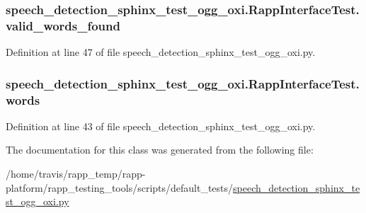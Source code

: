 \hypertarget{classspeech__detection__sphinx__test__ogg__oxi_1_1RappInterfaceTest_a74ac425a0ac46811a1f5e3796cc92e71}{
\subsubsection[{valid\-\_\-words\-\_\-found}]{\setlength{\rightskip}{0pt plus 5cm}speech\-\_\-detection\-\_\-sphinx\-\_\-test\-\_\-ogg\-\_\-oxi.\-Rapp\-Interface\-Test.\-valid\-\_\-words\-\_\-found}}\label{classspeech__detection__sphinx__test__ogg__oxi_1_1RappInterfaceTest_a74ac425a0ac46811a1f5e3796cc92e71}


Definition at line 47 of file speech\-\_\-detection\-\_\-sphinx\-\_\-test\-\_\-ogg\-\_\-oxi.\-py.

\hypertarget{classspeech__detection__sphinx__test__ogg__oxi_1_1RappInterfaceTest_ae6a274d1b4554695797d5ef5ae3fe2b0}{
\subsubsection[{words}]{\setlength{\rightskip}{0pt plus 5cm}speech\-\_\-detection\-\_\-sphinx\-\_\-test\-\_\-ogg\-\_\-oxi.\-Rapp\-Interface\-Test.\-words}}\label{classspeech__detection__sphinx__test__ogg__oxi_1_1RappInterfaceTest_ae6a274d1b4554695797d5ef5ae3fe2b0}


Definition at line 43 of file speech\-\_\-detection\-\_\-sphinx\-\_\-test\-\_\-ogg\-\_\-oxi.\-py.



The documentation for this class was generated from the following file\-:\begin{DoxyCompactItemize}
\item 
/home/travis/rapp\-\_\-temp/rapp-\/platform/rapp\-\_\-testing\-\_\-tools/scripts/default\-\_\-tests/\hyperlink{speech__detection__sphinx__test__ogg__oxi_8py}{speech\-\_\-detection\-\_\-sphinx\-\_\-test\-\_\-ogg\-\_\-oxi.\-py}\end{DoxyCompactItemize}
